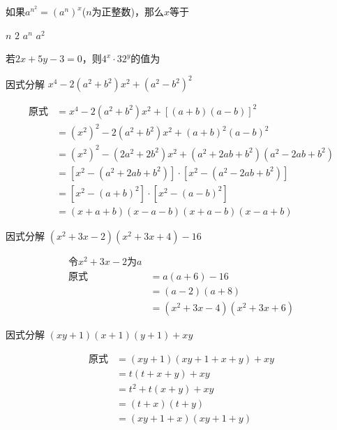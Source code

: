 \documentclass[answers]{exam}
\begin{document}
\begin{questions}

\question
  如果$a^{n^2}=(a^n)^x$($n$为正整数)，那么$x$等于
  
  \begin{choices}
  \correctchoice $n$
  \choice $2$
  \choice $a^n$
  \choice $a^2$
  \end{choices}

\question
  若$2x+5y-3=0$，则$4^x \cdot 32^y$的值为\fillin[8]

\question
  因式分解 $x^4-2(a^2+b^2)x^2+(a^2-b^2)^2$

\begin{solution}
\[
\begin{aligned}
  \mbox{原式} &= x^4-2(a^2+b^2)x^2+[(a+b)(a-b)]^2 \\
  &= (x^2)^2 - 2(a^2+b^2)x^2+(a+b)^2(a-b)^2 \\
  &= (x^2)^2-(2a^2+2b^2)x^2+(a^2+2ab+b^2)(a^2-2ab+b^2) \\
  &= [x^2-(a^2+2ab+b^2)] \cdot [x^2-(a^2-2ab+b^2)] \\
  &= [x^2-(a+b)^2] \cdot [x^2-(a-b)^2] \\
  &= (x+a+b)(x-a-b)(x+a-b)(x-a+b)
\end{aligned}
\]
\end{solution}

\question
  因式分解 $(x^2+3x-2)(x^2+3x+4)-16$

\begin{solution}
\[
  \begin{aligned}
    \mbox{令} x^2+3x-2\mbox{为}a \\
    \mbox{原式} &= a(a+6)-16 \\
    &= (a-2)(a+8) \\
    &= (x^2+3x-4)(x^2+3x+6)
  \end{aligned}
\]
\end{solution}

\question
  因式分解 $(xy+1)(x+1)(y+1)+xy$

\begin{solution}
\[
\begin{aligned}
  \mbox{原式} &= (xy+1)(xy+1+x+y)+xy \\
  &= t(t+x+y)+xy \\
  &= t^2+t(x+y)+xy \\
  &= (t+x)(t+y) \\
  &= (xy + 1 + x)(xy + 1 + y)
\end{aligned}
\]
\end{solution}


\end{questions}
\end{document}
